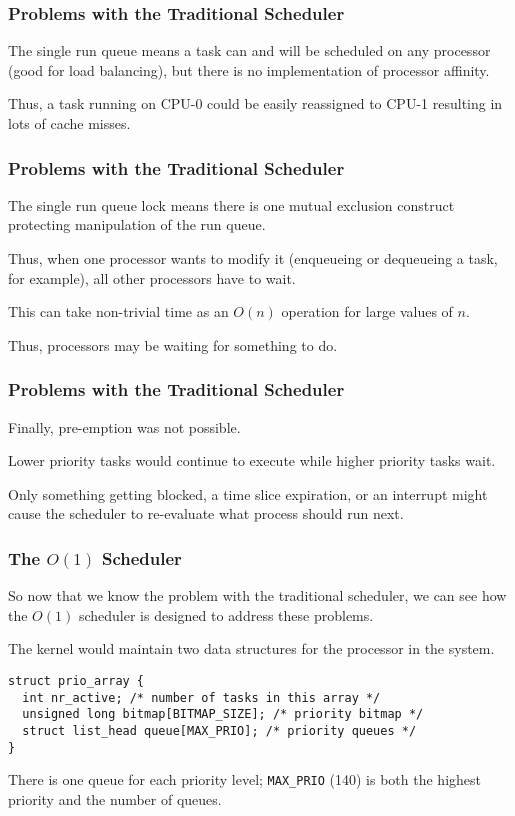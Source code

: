 \begin{frame}
\frametitle{Problems with the Traditional Scheduler}

The single run queue means a task can and will be scheduled on any processor (good for load balancing), but there is no implementation of processor affinity. 

Thus, a task running on CPU-0 could be easily reassigned to CPU-1 resulting in lots of cache misses.

\end{frame}

\begin{frame}
\frametitle{Problems with the Traditional Scheduler}

The single run queue lock means there is one mutual exclusion construct protecting manipulation of the run queue. 

Thus, when one processor wants to modify it (enqueueing or dequeueing a task, for example), all other processors have to wait.

This can take non-trivial time as an $O(n)$ operation for large values of $n$.


Thus, processors may be waiting for something to do.

\end{frame}

\begin{frame}
\frametitle{Problems with the Traditional Scheduler}

Finally, pre-emption was not possible. 

Lower priority tasks would continue to execute while higher priority tasks wait. 

Only something getting blocked, a time slice expiration, or an interrupt might cause the scheduler to re-evaluate what process should run next.


\end{frame}

\begin{frame}[fragile]
\frametitle{The $O(1)$ Scheduler}

So now that we know the problem with the traditional scheduler, we can see how the $O(1)$ scheduler is designed to address these problems. 

The kernel would maintain two data structures for the processor in the system.

\begin{verbatim}
struct prio_array {
  int nr_active; /* number of tasks in this array */
  unsigned long bitmap[BITMAP_SIZE]; /* priority bitmap */
  struct list_head queue[MAX_PRIO]; /* priority queues */
}
\end{verbatim}

There is one queue for each priority level; \texttt{MAX\_PRIO} (140) is both the highest priority and the number of queues. 

\end{frame}

